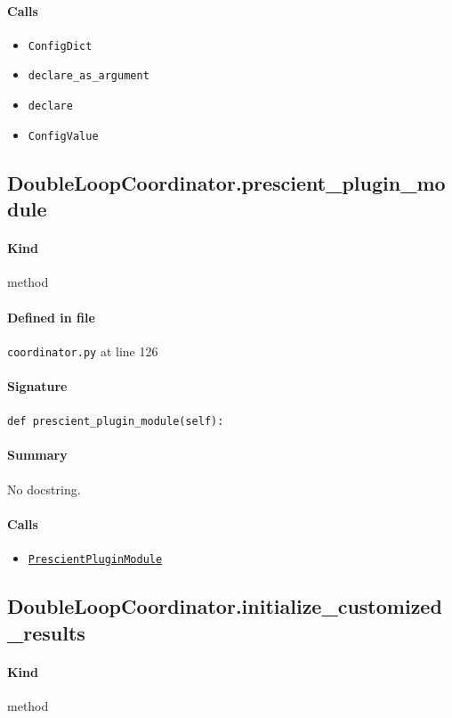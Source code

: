\documentclass[11pt]{report}
\begin{document}
\paragraph{Calls}
\begin{itemize}[leftmargin=*]
  \item \texttt{ConfigDict}
  \item \texttt{declare\_as\_argument}
  \item \texttt{declare}
  \item \texttt{ConfigValue}
\end{itemize}
\subsection{DoubleLoopCoordinator.prescient\_plugin\_module}
\label{def:coordinator.py:DoubleLoopCoordinator.prescient_plugin_module:L126}
\paragraph{Kind} method
\paragraph{Defined in file} \texttt{coordinator.py} at line 126
\paragraph{Signature} \texttt{def prescient\_plugin\_module(self):}
\paragraph{Summary} No docstring.
\paragraph{Calls}
\begin{itemize}[leftmargin=*]
  \item \hyperref[def:coordinator.py:PrescientPluginModule:L24]{\texttt{PrescientPluginModule}}
\end{itemize}
\subsection{DoubleLoopCoordinator.initialize\_customized\_results}
\label{def:coordinator.py:DoubleLoopCoordinator.initialize_customized_results:L129}
\paragraph{Kind} method
\end{document}

